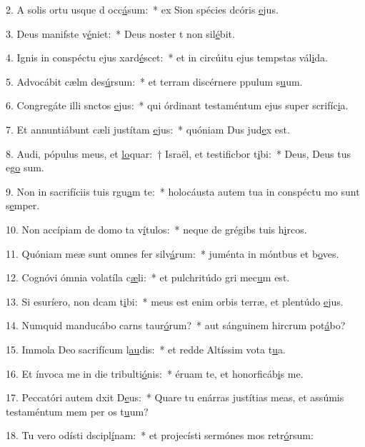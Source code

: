 2. A solis ortu usque d occ\uline{á}sum:~* ex Sion spécies dcóris \uline{e}jus.\par 
3. Deus manifste v\uline{é}niet:~* Deus noster t non sil\uline{é}bit.\par 
4. Ignis in conspéctu ejus xard\uline{é}scet:~* et in circúitu ejus tempstas vál\uline{i}da.\par 
5. Advocábit cælm des\uline{ú}rsum:~* et terram discérnere ppulum s\uline{u}um.\par 
6. Congregáte illi snctos \uline{e}jus:~* qui órdinant testaméntum ejus super scrifíc\uline{i}a.\par 
7. Et annuntiábunt cæli justítam \uline{e}jus:~* quóniam Dus jud\uline{e}x est.\par 
8. Audi, pópulus meus, et \uline{lo}quar:~† Israël, et testificbor t\uline{i}bi:~* Deus, Deus tus eg\uline{o} sum.\par 
9. Non in sacrifíciis tuis rgu\uline{a}m te:~* holocáusta autem tua in conspéctu mo sunt s\uline{e}mper.\par 
10. Non accípiam de domo ta v\uline{í}tulos:~* neque de grégibs tuis h\uline{i}rcos.\par 
11. Quóniam meæ sunt omnes fer silv\uline{á}rum:~* juménta in móntbus et b\uline{o}ves.\par 
12. Cognóvi ómnia volatíla c\uline{æ}li:~* et pulchritúdo gri mec\uline{u}m est.\par 
13. Si esuríero, non dcam t\uline{i}bi:~* meus est enim orbis terræ, et plentúdo \uline{e}jus.\par 
14. Numquid manducábo carns taur\uline{ó}rum?~* aut sánguinem hircrum pot\uline{á}bo?\par 
15. Immola Deo sacrifícum l\uline{au}dis:~* et redde Altíssim vota t\uline{u}a.\par 
16. Et ínvoca me in die tribulti\uline{ó}nis:~* éruam te, et honorficáb\uline{i}s me.\par 
17. Peccatóri autem dxit D\uline{e}us:~* Quare tu enárras justítias meas, et assúmis testaméntum mem per os t\uline{u}um?\par 
18. Tu vero odísti dscipl\uline{í}nam:~* et projecísti sermónes mos retr\uline{ó}rsum:\par 
